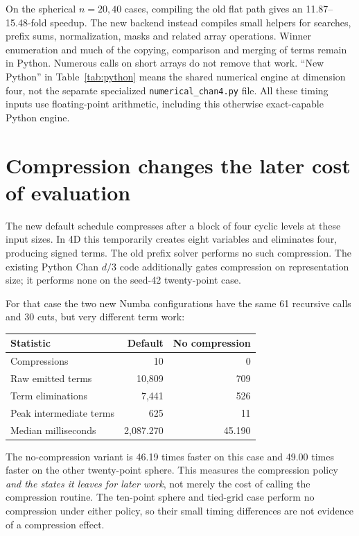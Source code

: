 \documentclass[12pt,a4paper]{article}
\begin{document}
On the spherical $n=20,40$ cases, compiling the old flat path gives an
11.87--15.48-fold speedup. The new backend instead compiles small helpers for
searches, prefix sums, normalization, masks and related array operations.
Winner enumeration and much of the copying, comparison and merging of terms
remain in Python. Numerous calls on short arrays do not remove that work.
``New Python'' in Table~\ref{tab:python} means the shared numerical engine
at dimension four, not the separate specialized \texttt{numerical\_chan4.py}
file. All these timing inputs use floating-point arithmetic, including this
otherwise exact-capable Python engine.

\section{Compression changes the later cost of evaluation}
The new default schedule compresses after a block of four cyclic levels at
these input sizes. In 4D this temporarily creates eight variables and eliminates
four, producing signed terms. The old prefix solver performs no such compression.
The existing Python Chan $d/3$ code additionally gates compression on representation
size; it performs none on the seed-42 twenty-point case.

For that case the two new Numba configurations have the same 61 recursive
calls and 30 cuts, but very different term work:

\begin{center}\small
\begin{tabular}{lrr}\toprule
Statistic & Default & No compression\\\midrule
Compressions & 10 & 0\\
Raw emitted terms & 10,809 & 709\\
Term eliminations & 7,441 & 526\\
Peak intermediate terms & 625 & 11\\
Median milliseconds & 2,087.270 & 45.190\\\bottomrule
\end{tabular}
\end{center}

The no-compression variant is 46.19 times faster on this case and 49.00 times
faster on the other twenty-point sphere. This measures the compression policy
\emph{and the states it leaves for later work}, not merely the cost of calling
the compression routine. The ten-point sphere and tied-grid case perform no
compression under either policy, so their small timing differences are not
evidence of a compression effect.
\end{document}
